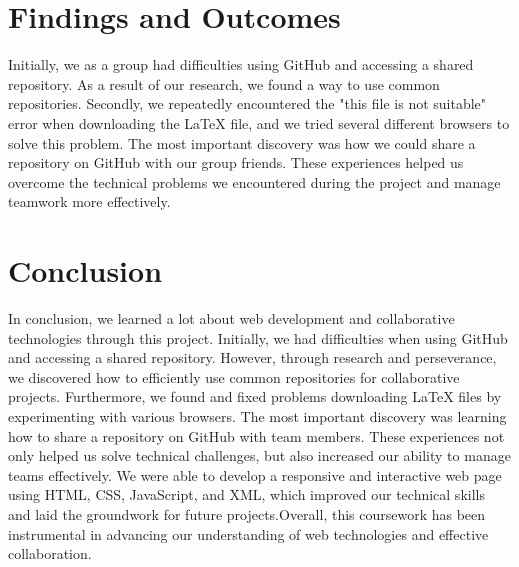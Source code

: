\documentclass{article}
\begin{document}
\section{Findings and Outcomes}

Initially, we as a group had difficulties using GitHub and accessing a shared repository. As a result of our research, we found a way to use common repositories. Secondly, we repeatedly encountered the "this file is not suitable" error when downloading the LaTeX file, and we tried several different browsers to solve this problem. The most important discovery was how we could share a repository on GitHub with our group friends. These experiences helped us overcome the technical problems we encountered during the project and manage teamwork more effectively.
  

\section{Conclusion}

In conclusion, we learned a lot about web development and collaborative technologies through this project. Initially, we had difficulties when using GitHub and accessing a shared repository. However, through research and perseverance, we discovered how to efficiently use common repositories for collaborative projects. Furthermore, we found and fixed problems downloading LaTeX files by experimenting with various browsers. The most important discovery was learning how to share a repository on GitHub with team members. These experiences not only helped us solve technical challenges, but also increased our ability to manage teams effectively. We were able to develop a responsive and interactive web page using HTML, CSS, JavaScript, and XML, which improved our technical skills and laid the groundwork for future projects.Overall, this coursework has been instrumental in advancing our understanding of web technologies and effective collaboration.
\end{document}
